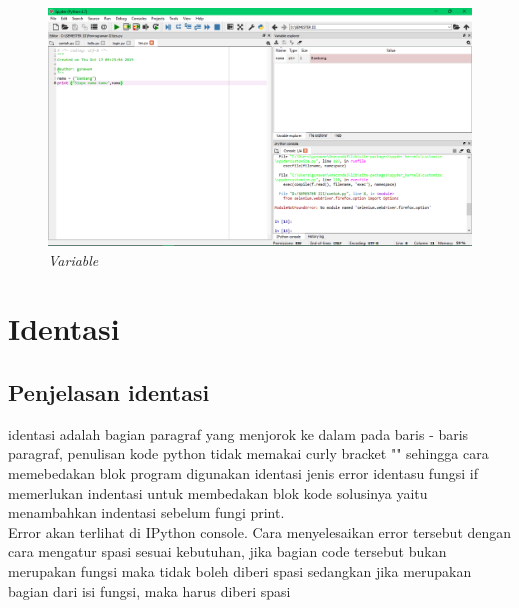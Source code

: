 \begin{figure}[!htbp]
    \centering
    \includegraphics[scale=0.3]{gambar/tess.png}
    \caption{\textit{Variable}}
    \label{Figure1}
\end{figure}

\section{Identasi}
\subsection{Penjelasan identasi}
identasi adalah bagian paragraf yang menjorok ke dalam pada baris - baris paragraf, penulisan kode python tidak memakai curly bracket "{}" sehingga cara memebedakan blok program digunakan identasi
jenis error identasu fungsi if memerlukan indentasi untuk membedakan blok kode solusinya yaitu menambahkan indentasi sebelum fungi print.\\
Error akan terlihat di IPython console. Cara menyelesaikan error tersebut dengan cara mengatur spasi sesuai kebutuhan, jika bagian code tersebut bukan merupakan fungsi maka tidak boleh diberi spasi sedangkan jika merupakan bagian dari isi fungsi, maka harus diberi spasi 